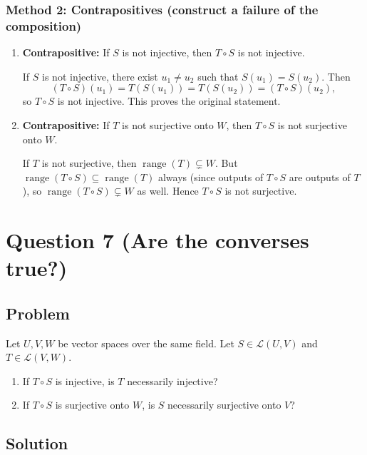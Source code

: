 \documentclass[12pt]{article}
\newcommand{\cL}{\mathcal{L}}
\DeclareMathOperator{\Range}{range}
\begin{document}
\subsubsection{Method 2: Contrapositives (construct a failure of the composition)}
\begin{enumerate}[label=(\arabic*)]
\item \textbf{Contrapositive:} If $S$ is not injective, then $T\circ S$ is not injective.

If $S$ is not injective, there exist $u_1\neq u_2$ such that $S(u_1)=S(u_2)$.
Then
\[
(T\circ S)(u_1)=T(S(u_1))=T(S(u_2))=(T\circ S)(u_2),
\]
so $T\circ S$ is not injective. This proves the original statement.

\item \textbf{Contrapositive:} If $T$ is not surjective onto $W$, then $T\circ S$ is not surjective onto $W$.

If $T$ is not surjective, then $\Range(T)\subsetneq W$.
But $\Range(T\circ S)\subseteq \Range(T)$ always (since outputs of $T\circ S$ are outputs of $T$),
so $\Range(T\circ S)\subsetneq W$ as well. Hence $T\circ S$ is not surjective.
\end{enumerate}

\newpage
\section{Question 7 (Are the converses true?)}
\subsection{Problem}
Let $U,V,W$ be vector spaces over the same field.
Let $S\in\cL(U,V)$ and $T\in\cL(V,W)$.
\begin{enumerate}[label=(\alph*)]
\item If $T\circ S$ is injective, is $T$ necessarily injective?
\item If $T\circ S$ is surjective onto $W$, is $S$ necessarily surjective onto $V$?
\end{enumerate}

\subsection{Solution}
\end{document}
